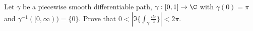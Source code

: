 Let $\gamma$ be a piecewise smooth differentiable path,
$\gamma:[0,1]\rightarrow \C$ with $\gamma(0)=\pi$ and
$\gamma^{-1}([0,\infty))=\{0\}$. Prove that $0< | \Im
\{\int_{\gamma} \frac{dz}{z} \}| < 2 \pi$.
